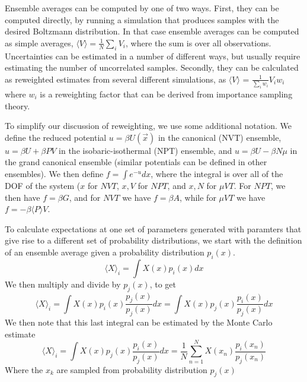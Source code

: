 \documentclass[aps,pre,twocolumn,nofootinbib,superscriptaddress,linenumbers,10pt, draft,tightenlines]{revtex4-1}
\begin{document}
Ensemble averages can be computed by one of two ways. First, they can
be computed directly, by running a simulation that produces samples
with the desired Boltzmann distribution.  In that case ensemble 
averages can be computed as simple averages, ${\langle {V} \rangle} =
\frac{1}{N}\sum_i V_i$, where the sum is over all observations.
Uncertainties can be estimated in a number of different ways, but
usually require estimating the number of uncorrelated
samples. Secondly, they can be calculated as reweighted estimates from
several different simulations, as ${\langle {V} \rangle}$ =
$\frac{1}{\sum_i w_i} V_i w_i$ where $w_i$ is a reweighting factor
that can be derived from importance sampling theory. 

To simplify our discussion of reweighting, we use some additional
notation.  We define the reduced potential $u = \beta U(\vec{x})$ in
the canonical (NVT) ensemble, $u = \beta U + \beta PV$ in the
isobaric-isothermal (NPT) ensemble, and $u = \beta U - \beta N\mu$ in
the grand canonical ensemble (similar potentials can be defined in
other ensembles). We then define $f = \int e^{-u} dx$, where the
integral is over all of the DOF of the system ($x$ for $NVT$, $x,V$ for
$NPT$, and $x,N$ for $\mu VT$.  For $NPT$, we then have $f = \beta G$, and for $NVT$
we have $f = \beta A$, while for $\mu V T$ we have $f = -\beta \langle
P \rangle V$.

To calculate expectations at one set of parameters generated with
paramters that give rise to a different set of probability
distributions, we start with the definition of an ensemble average
given a probability distribution $p_i(x)$. 
\begin{equation}
\langle X \rangle_i = \int X(x) p_i(x) dx 
\end{equation}
We then multiply and divide by $p_j(x)$, to get
\begin{equation}
\langle X \rangle_i = \int X(x) p_i(x) \frac{p_j(x)}{p_j(x)}dx = \int X(x) p_j(x) \frac{p_i(x)}{p_j(x)}dx 
\end{equation}
We then note that this last integral can be estimated by the Monte Carlo estimate
\begin{equation}
\langle X \rangle_i = \int X(x) p_j(x) \frac{p_i(x)}{p_j(x)}dx = \frac{1}{N}\sum_{n=1}^N X(x_n) \frac{p_i(x_n)}{p_j(x_n)}
\end{equation}
Where the $x_k$ are sampled from probability distribution $p_j(x)$
\end{document}
